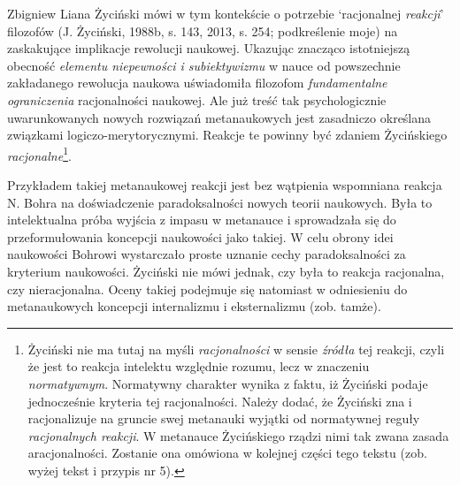 \begin{artplenv}{Zbigniew Liana}
Życiński mówi w tym kontekście o potrzebie ‘racjonalnej \textit{reakcji}’ filozofów \label{ref:RNDTgN8tnj5Jz}(J. Życiński,
1988b, s. 143, 2013, s. 254; podkreślenie moje) na zaskakujące implikacje rewolucji naukowej. Ukazując znacząco
istotniejszą obecność \textit{elementu niepewności i subiektywizmu} w nauce od powszechnie zakładanego rewolucja naukowa
uświadomiła filozofom \textit{fundamentalne ograniczenia} racjonalności naukowej. Ale już treść tak psychologicznie
uwarunkowanych nowych rozwiązań metanaukowych jest zasadniczo określana związkami logiczo-merytorycznymi. Reakcje te
powinny być zdaniem Życińskiego \textit{racjonalne}\footnote{Życiński nie ma tutaj na myśli \textit{racjonalności} w sensie
	\textit{źródła} tej reakcji, czyli że jest to reakcja intelektu względnie rozumu, lecz w znaczeniu \textit{normatywnym}.
	Normatywny charakter wynika z faktu, iż Życiński podaje jednocześnie kryteria tej racjonalności. Należy dodać, że
	Życiński zna i racjonalizuje na gruncie swej metanauki wyjątki od normatywnej reguły \textit{racjonalnych reakcji}. W
	metanauce Życińskiego rządzi nimi tak zwana zasada aracjonalności. Zostanie ona omówiona w kolejnej części tego tekstu
	(zob. wyżej tekst i przypis nr 5).}.

Przykładem takiej metanaukowej reakcji jest bez wątpienia wspomniana reakcja N. Bohra na doświadczenie paradoksalności
nowych teorii naukowych. Była to intelektualna próba wyjścia z impasu w metanauce i sprowadzała się do przeformułowania
koncepcji naukowości jako takiej. W celu obrony idei naukowości Bohrowi wystarczało proste uznanie cechy
paradoksalności za kryterium naukowości. Życiński nie mówi jednak, czy była to reakcja racjonalna, czy nieracjonalna.
Oceny takiej podejmuje się natomiast w odniesieniu do metanaukowych koncepcji internalizmu i eksternalizmu (zob.
tamże).


\end{artplenv}
